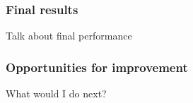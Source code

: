 
\begin{frame}
  \frametitle{Final results}

  \color{white} Talk about final performance

\end{frame}

\begin{frame}
  \frametitle{Opportunities for improvement}

  \color{white} What would I do next?

\end{frame}
